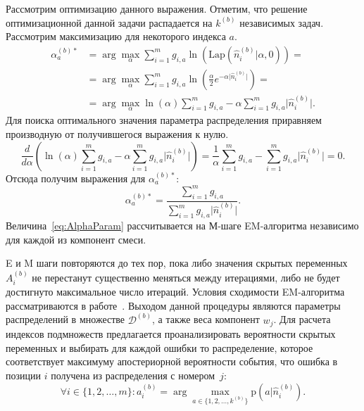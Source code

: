 Рассмотрим оптимизацию данного выражения. Отметим, что решение оптимизационной данной задачи распадается на $k^{(b)}$ независимых задач. Рассмотрим максимизацию для некоторого индекса $a$.
\begin{equation*}
\begin{split}
\alpha_a^{(b)*} & = \arg\max_{\alpha} \sum\limits_{i=1}^{m} g_{i,a} \ln\left(\mathrm{Lap}(\hat{n}_i^{(b)} \vert \alpha, 0)\right) = \\
& = \arg\max_{\alpha} \sum\limits_{i=1}^{m} g_{i,a} \ln\left( \frac{\alpha}{2}e^{-\alpha \vert \hat{n}_i^{(b)} \vert } \right) = \\
& = \arg\max_{\alpha} \ln(\alpha) \sum\limits_{i=1}^{m} g_{i,a} - \alpha \sum\limits_{i=1}^{m} g_{i,a} \vert \hat{n}_i^{(b)} \vert.
\end{split}
\end{equation*}
Для поиска оптимального значения параметра распределения приравняем производную от получившегося выражения к нулю.
\begin{equation*}
\frac{d}{d\alpha} \left( \ln(\alpha) \sum\limits_{i=1}^{m} g_{i,a} - \alpha \sum\limits_{i=1}^{m} g_{i,a} \vert \hat{n}_i^{(b)} \vert \right) = \frac{1}{\alpha} \sum\limits_{i=1}^{m} g_{i,a} - \sum\limits_{i=1}^{m} g_{i,a} \vert \hat{n}_i^{(b)} \vert = 0.
\end{equation*}
Отсюда получим выражения для $\alpha_a^{(b)*}$:
\begin{equation}
\alpha_a^{(b)*} = \frac{\sum\limits_{i=1}^{m} g_{i,a}}{\sum\limits_{i=1}^{m} g_{i,a} \vert \hat{n}_i^{(b)} \vert}.
\label{eq:AlphaParam}
\end{equation}
Величина~\ref{eq:AlphaParam} рассчитывается на М-шаге EM-алгоритма независимо для каждой из компонент смеси. 

E и M шаги повторяются до тех пор, пока либо значения скрытых переменных $A_i^{(b)}$ не перестанут существенно меняться между итерациями, либо не будет достигнуто максимальное число итераций. Условия сходимости EM-алгоритма рассматриваются в работе~\cite{wu83}. Выходом данной процедуры являются параметры распределений в множестве $\mathcal{D}^{(b)}$, а также веса компонент $w_j$. Для расчета индексов подмножеств предлагается проанализировать вероятности скрытых переменных и выбирать для каждой ошибки то распределение, которое соответствует максимуму апостериорной вероятности события, что ошибка в позиции $i$ получена из распределения с номером~$j$:
\begin{equation}
    \forall i \in \{1,2,\ldots,m\} : a^{(b)}_i = \arg\max_{a \in \{1,2,\ldots,k^{(b)} \} }
    \mathrm{p}(a \vert \hat{n}_i^{(b)}).
\end{equation}

